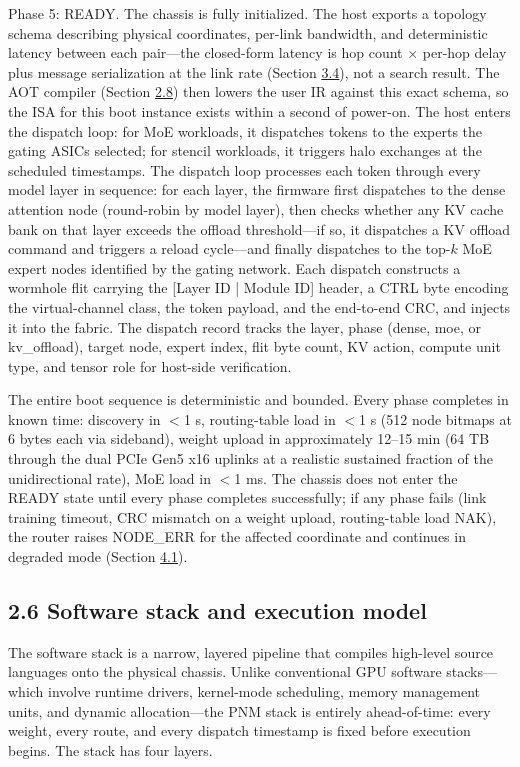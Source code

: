 \documentclass[10pt,twocolumn]{article}
\begin{document}
Phase 5: READY. The chassis is fully initialized. The host exports a topology schema describing physical coordinates, per-link bandwidth, and deterministic latency between each pair---the closed-form latency is hop count $\times$ per-hop delay plus message serialization at the link rate (Section \hyperref[sec:3.4]{3.4}), not a search result. The AOT compiler (Section \hyperref[sec:2.8]{2.8}) then lowers the user IR against this exact schema, so the ISA for this boot instance exists within a second of power-on. The host enters the dispatch loop: for MoE workloads, it dispatches tokens to the experts the gating ASICs selected; for stencil workloads, it triggers halo exchanges at the scheduled timestamps. The dispatch loop processes each token through every model layer in sequence: for each layer, the firmware first dispatches to the dense attention node (round-robin by model layer), then checks whether any KV cache bank on that layer exceeds the offload threshold---if so, it dispatches a KV offload command and triggers a reload cycle---and finally dispatches to the top-$k$ MoE expert nodes identified by the gating network. Each dispatch constructs a wormhole flit carrying the [Layer ID | Module ID] header, a CTRL byte encoding the virtual-channel class, the token payload, and the end-to-end CRC, and injects it into the fabric. The dispatch record tracks the layer, phase (dense, moe, or kv\_offload), target node, expert index, flit byte count, KV action, compute unit type, and tensor role for host-side verification.

The entire boot sequence is deterministic and bounded. Every phase completes in known time: discovery in $<$1 s, routing-table load in $<$1 s (512 node bitmaps at 6 bytes each via sideband), weight upload in approximately 12--15 min (64 TB through the dual PCIe Gen5 x16 uplinks at a realistic sustained fraction of the unidirectional rate), MoE load in $<$1 ms. The chassis does not enter the READY state until every phase completes successfully; if any phase fails (link training timeout, CRC mismatch on a weight upload, routing-table load NAK), the router raises NODE\_ERR for the affected coordinate and continues in degraded mode (Section \hyperref[sec:4.1]{4.1}).

\subsection*{2.6 Software stack and execution model}\label{sec:2.6}

The software stack is a narrow, layered pipeline that compiles high-level source languages onto the physical chassis. Unlike conventional GPU software stacks---which involve runtime drivers, kernel-mode scheduling, memory management units, and dynamic allocation---the PNM stack is entirely ahead-of-time: every weight, every route, and every dispatch timestamp is fixed before execution begins. The stack has four layers.
\end{document}
